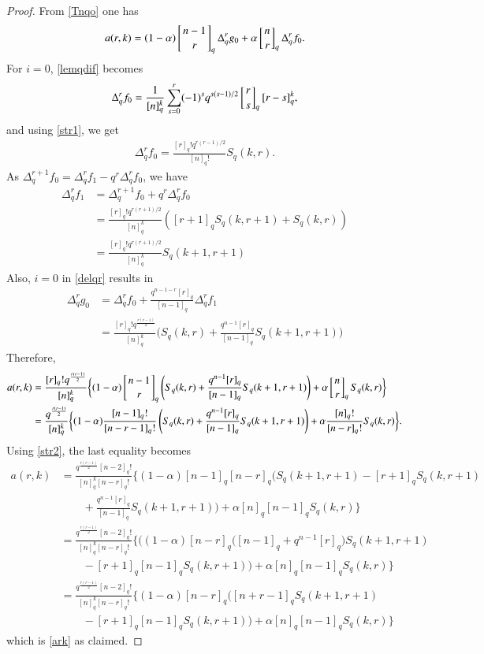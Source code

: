 \documentclass[12pt]{article}
\numberwithin{equation}{section} \theoremstyle{plain}
\theoremstyle{definition}
\theoremstyle{remark}
\newcommand{\qbinom}[2]{\left[\genfrac{}{}{0pt}{}{#1}{#2}\right]_{q}}
\begin{document}
\begin{proof} From \eqref{Tnqo} one has 
\begin{align*}
a(r,k)=(1-\alpha)\qbinom{n-1}{r}\Delta_q^rg_0+\alpha\qbinom{n}{r}\Delta_q^rf_0.
\end{align*}
For $i=0$, \eqref{lemqdif} becomes
\begin{align*}
\Delta_q^{r}f_0=\frac{1}{[n]_q^k}\sum_{s=0}^r (-1)^s q^{s(s-1)/2} \qbinom{r}{s} [r-s]_q^k,
\end{align*}
and using \eqref{str1}, we get 
\begin{align*}
\Delta_q^rf_0=\frac{[r]_q!q^{r(r-1)/2}}{[n]_q!}S_q(k,r).
\end{align*}
As $\Delta_q^{r+1}f_0=\Delta_q^rf_1-q^r\Delta_q^rf_0$, we have 
\begin{align*}
\Delta_q^rf_1&=\Delta_q^{r+1}f_0+q^r\Delta_q^rf_0\\
             &=\frac{[r]_q!q^{r(r+1)/2}}{[n]^k_q}([r+1]_qS_q(k,r+1)+S_q(k,r))\\
						 &=\frac{[r]_q!q^{r(r+1)/2}}{[n]^k_q}S_q(k+1,r+1)
\end{align*}
Also, $i=0$ in \eqref{delqr} results in
\begin{align*}
\Delta_q^rg_0&=\Delta_q^rf_0+\frac{q^{n-1-r}[r]_q}{[n-1]_q}\Delta_q^rf_1\\
						 &=\frac{[r]_q!q^{\frac{r(r-1)}{2}}}{[n]_q^k}\bigg(S_q(k,r)+\frac{q^{n-1}[r]_q}{[n-1]_q}S_q(k+1,r+1)\bigg)
\end{align*}
Therefore, 
\begin{align*}
a(r,k)&=\frac{[r]_q!q^{\frac{r(r-1)}{2}}}{[n]_q^k}\bigg\{(1-\alpha)\qbinom{n-1}{r}\left(S_q(k,r)+\frac{q^{n-1}[r]_q}{[n-1]_q}S_q(k+1,r+1) \right)+\alpha\qbinom{n}{r}S_q(k,r)\bigg\}\\
&=\frac{q^{\frac{r(r-1)}{2}}}{[n]_q^k}\bigg\{(1-\alpha)\frac{[n-1]_q!}{[n-r-1]_q!}\left(S_q(k,r)+\frac{q^{n-1}[r]_q}{[n-1]_q}S_q(k+1,r+1)\right)+\alpha\frac{[n]_q!}{[n-r]_q!}S_q(k,r)\bigg\}.
\end{align*}
Using \eqref{str2}, the last equality becomes 
\begin{align*}
a(r,k)
&=\frac{q^{\frac{r(r-1)}{2}}[n-2]_q!}{[n]_q^k[n-r]_q!}\bigg\{(1-\alpha)[n-1]_q[n-r]_q\bigg(S_q(k+1,r+1)-[r+1]_qS_q(k,r+1)\\
&\qquad+\frac{q^{n-1}[r]_q}{[n-1]_q}S_q(k+1,r+1)\bigg)+\alpha[n]_q[n-1]_qS_q(k,r)\bigg\}\\
&=\frac{q^{\frac{r(r-1)}{2}}[n-2]_q!}{[n]_q^k[n-r]_q!}\bigg\{\bigg((1-\alpha)[n-r]_q\big([n-1]_q+q^{n-1}[r]_q\big)S_q(k+1,r+1)\\
&\qquad -[r+1]_q[n-1]_qS_q(k,r+1)\bigg)+\alpha[n]_q[n-1]_qS_q(k,r)\bigg\}\\
&=\frac{q^{\frac{r(r-1)}{2}}[n-2]_q!}{[n]_q^k[n-r]_q!}\bigg\{(1-\alpha)[n-r]_q\bigg([n+r-1]_qS_q(k+1,r+1)\\
&\qquad-[r+1]_q[n-1]_qS_q(k,r+1)\bigg)+\alpha[n]_q[n-1]_qS_q(k,r)\bigg\}
\end{align*}
which is \eqref{ark} as claimed.
\end{proof}
\end{document}
